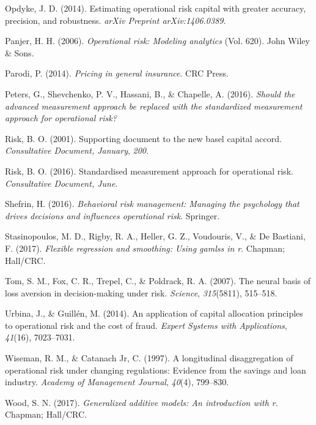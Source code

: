 \documentclass{DissertateUSU}
\begin{document}
\leavevmode\hypertarget{ref-opdyke2014estimating}{}%
Opdyke, J. D. (2014). Estimating operational risk capital with greater
accuracy, precision, and robustness. \emph{arXiv Preprint
arXiv:1406.0389}.

\leavevmode\hypertarget{ref-panjer2006operational}{}%
Panjer, H. H. (2006). \emph{Operational risk: Modeling analytics} (Vol.
620). John Wiley \& Sons.

\leavevmode\hypertarget{ref-parodi2014pricing}{}%
Parodi, P. (2014). \emph{Pricing in general insurance}. CRC Press.

\leavevmode\hypertarget{ref-peters2016should}{}%
Peters, G., Shevchenko, P. V., Hassani, B., \& Chapelle, A. (2016).
\emph{Should the advanced measurement approach be replaced with the
standardized measurement approach for operational risk?}

\leavevmode\hypertarget{ref-risk2001supporting}{}%
Risk, B. O. (2001). Supporting document to the new basel capital accord.
\emph{Consultative Document, January}, \emph{200}.

\leavevmode\hypertarget{ref-risk2016supporting}{}%
Risk, B. O. (2016). Standardised measurement approach for operational
risk. \emph{Consultative Document, June}.

\leavevmode\hypertarget{ref-shefrin2016behavioral}{}%
Shefrin, H. (2016). \emph{Behavioral risk management: Managing the
psychology that drives decisions and influences operational risk}.
Springer.

\leavevmode\hypertarget{ref-stasinopoulos2017flexible}{}%
Stasinopoulos, M. D., Rigby, R. A., Heller, G. Z., Voudouris, V., \& De
Bastiani, F. (2017). \emph{Flexible regression and smoothing: Using
gamlss in r}. Chapman; Hall/CRC.

\leavevmode\hypertarget{ref-tom2007neural}{}%
Tom, S. M., Fox, C. R., Trepel, C., \& Poldrack, R. A. (2007). The
neural basis of loss aversion in decision-making under risk.
\emph{Science}, \emph{315}(5811), 515--518.

\leavevmode\hypertarget{ref-urbina2014application}{}%
Urbina, J., \& Guillén, M. (2014). An application of capital allocation
principles to operational risk and the cost of fraud. \emph{Expert
Systems with Applications}, \emph{41}(16), 7023--7031.

\leavevmode\hypertarget{ref-wiseman1997longitudinal}{}%
Wiseman, R. M., \& Catanach Jr, C. (1997). A longitudinal disaggregation
of operational risk under changing regulations: Evidence from the
savings and loan industry. \emph{Academy of Management Journal},
\emph{40}(4), 799--830.

\leavevmode\hypertarget{ref-wood2017generalized}{}%
Wood, S. N. (2017). \emph{Generalized additive models: An introduction
with r}. Chapman; Hall/CRC.


\end{document}
